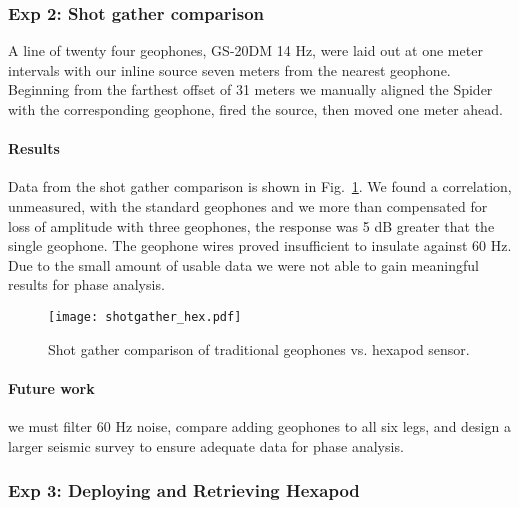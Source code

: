 \subsubsection{Exp 2: Shot gather comparison}

A line of twenty four geophones, GS-20DM 14 Hz, were laid out at one meter intervals with our inline source seven meters from the nearest geophone. Beginning from the farthest offset of 31 meters we manually aligned the Spider with the corresponding geophone, fired the source, then moved one meter ahead. 

\paragraph{Results}
Data from the shot gather comparison is shown in Fig.~\ref{fig:shotgatherHexpod}.
We found a correlation, unmeasured, with the standard geophones and we more than compensated for loss of amplitude with three geophones, the response was 5 dB greater that the single geophone. The geophone wires proved insufficient to insulate against 60 Hz. Due to the small amount of usable data we were not able to gain meaningful results for phase analysis.   

\begin{figure} \centering
  {\texttt{[image: shotgather\_hex.pdf]}}
 \caption{Shot gather comparison of traditional geophones vs. hexapod sensor. 
 \label{fig:shotgatherHexpod}}
\end{figure}


\paragraph{Future work}	we must filter 60 Hz noise, compare adding geophones to all six legs, and design a larger seismic survey to ensure adequate data for phase analysis.   

\subsubsection{Exp 3: Deploying and Retrieving Hexapod}
